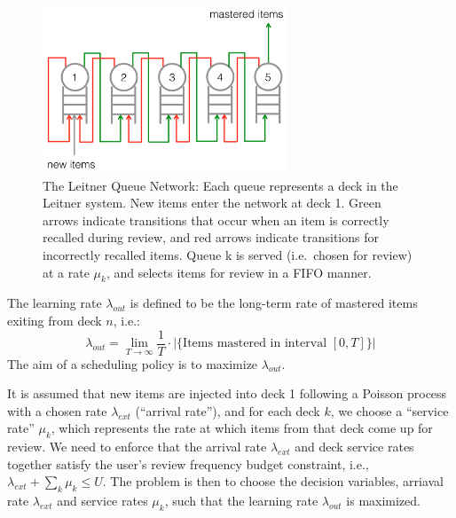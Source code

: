 \begin{figure}
\centering
\includegraphics[width=0.65000\textwidth]{assets/leitner-paper.png}
\caption[The Leitner Queue Network: Each queue represents a deck in the
Leitner system. New items enter the network at deck 1. Green arrows
indicate transitions that occur when an item is correctly recalled
during review, and red arrows indicate transitions for incorrectly
recalled items. Queue k is served (i.e.~chosen for review) at a rate
\(\mu_k\), and selects items for review in a FIFO manner.]{The Leitner
Queue Network: Each queue represents a deck in the Leitner system. New
items enter the network at deck 1. Green arrows indicate transitions
that occur when an item is correctly recalled during review, and red
arrows indicate transitions for incorrectly recalled items. Queue k is
served (i.e.~chosen for review) at a rate \(\mu_k\), and selects items
for review in a FIFO manner.\footnotemark{}}\label{fig:leitner-paper}
\end{figure}

The learning rate \(\lambda_{out}\) is defined to be the long-term rate
of mastered items exiting from deck \(n\), i.e.: \[
\lambda_{out} = \lim_{T \rightarrow \infty} \frac{1}{T} \cdot \left|\{\text{Items mastered in interval } [0, T ]\}\right| 
\] The aim of a scheduling policy is to maximize \(\lambda_{out}\).

It is assumed that new items are injected into deck 1 following a
Poisson process with a chosen rate \(\lambda_{ext}\) (``arrival rate''),
and for each deck \(k\), we choose a ``service rate'' \(\mu_k\), which
represents the rate at which items from that deck come up for review. We
need to enforce that the arrival rate \(\lambda_{ext}\) and deck service
rates together satisfy the user's review frequency budget constraint,
i.e., \(\lambda_{ext} + \sum\limits_{k} \mu_k \leq U\). The problem is
then to choose the decision variables, arriaval rate \(\lambda_{ext}\)
and service rates \(\mu_k\), such that the learning rate
\(\lambda_{out}\) is maximized.

